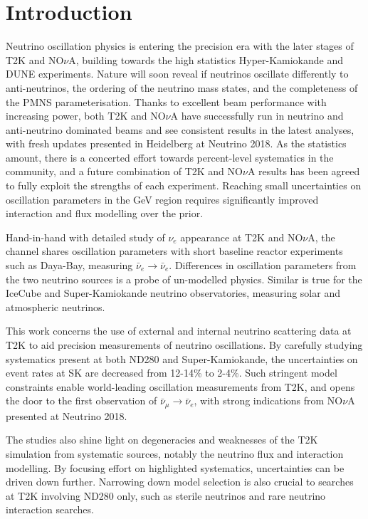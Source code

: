 \chapter{Introduction}
\label{chap:intro}
Neutrino oscillation physics is entering the precision era with the later stages of T2K\cite{t2k_2017} and NO$\nu$A\cite{nova_2018}, building towards the high statistics Hyper-Kamiokande\cite{hyperk} and DUNE\cite{dune} experiments. Nature will soon reveal if neutrinos oscillate differently to anti-neutrinos, the ordering of the neutrino mass states, and the completeness of the PMNS parameterisation\cite{p1,p2,mns}. Thanks to excellent beam performance with increasing power, both T2K and NO$\nu$A have successfully run in neutrino and anti-neutrino dominated beams and see consistent results in the latest analyses, with fresh updates presented in Heidelberg at Neutrino 2018\cite{t2k_neutrino2018, nova_neutrino2018}. As the statistics amount, there is a concerted effort towards percent-level systematics in the community, and a future combination of T2K and NO$\nu$A results has been agreed to fully exploit the strengths of each experiment\cite{t2k_nova, t2k_nova_meet}. Reaching small uncertainties on oscillation parameters in the GeV region requires significantly improved interaction and flux modelling over the prior\cite{t2k_ii, dune_exp}.

Hand-in-hand with detailed study of $\nu_e$ appearance at T2K and NO$\nu$A, the channel shares oscillation parameters with short baseline reactor experiments such as Daya-Bay\cite{daya_bay}, measuring $\bar{\nu}_e\rightarrow \bar{\nu}_e$. Differences in oscillation parameters from the two neutrino sources is a probe of un-modelled physics. Similar is true for the IceCube\cite{icecube} and Super-Kamiokande\cite{superk} neutrino observatories, measuring solar and atmospheric neutrinos.

This work concerns the use of external and internal neutrino scattering data at T2K to aid precision measurements of neutrino oscillations. By carefully studying systematics present at both ND280 and Super-Kamiokande, the uncertainties on event rates at SK are decreased from 12-14\% to 2-4\%. Such stringent model constraints enable world-leading oscillation measurements from T2K\cite{pdg_2017}, and opens the door to the first observation of $\bar{\nu}_\mu \rightarrow \bar{\nu}_e$, with strong indications from NO$\nu$A presented at Neutrino 2018\cite{nova_neutrino2018}.

The studies also shine light on degeneracies and weaknesses of the T2K simulation from systematic sources, notably the neutrino flux and interaction modelling. By focusing effort on highlighted systematics, uncertainties can be driven down further. Narrowing down model selection is also crucial to searches at T2K involving ND280 only, such as sterile neutrinos and rare neutrino interaction searches.

